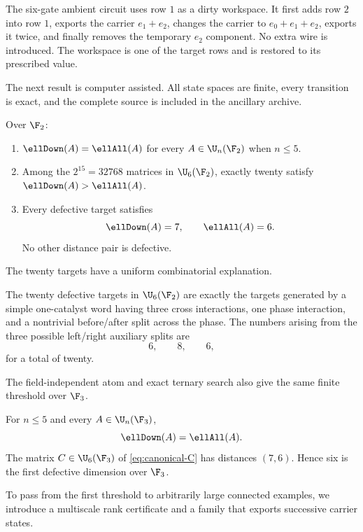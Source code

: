The six-gate ambient circuit uses row $1$ as a dirty workspace.  It first adds row $2$ into row $1$, exports the carrier $e_1+e_2$, changes the carrier to $e_0+e_1+e_2$, exports it twice, and finally removes the temporary $e_2$ component.  No extra wire is introduced.  The workspace is one of the target rows and is restored to its prescribed value.

The next result is computer assisted.  All state spaces are finite, every transition is exact, and the complete source is included in the ancillary archive.

\begin{theorem}\label{thm:binary-census}
Over $\F_2$:
\begin{enumerate}[label=\textup{(\roman*)}]
\item $\ellDown(A)=\ellAll(A)$ for every $A\in\U_n(\F_2)$ when $n\le5$.
\item Among the $2^{15}=32768$ matrices in $\U_6(\F_2)$, exactly twenty satisfy $\ellDown(A)>\ellAll(A)$.
\item Every defective target satisfies
\[
\ellDown(A)=7,
\qquad
\ellAll(A)=6.
\]
No other distance pair is defective.
\end{enumerate}
\end{theorem}

The twenty targets have a uniform combinatorial explanation.

\begin{theorem}\label{thm:motif-classification}
The twenty defective targets in $\U_6(\F_2)$ are exactly the targets generated by a simple one-catalyst word having three cross interactions, one phase interaction, and a nontrivial before/after split across the phase.  The numbers arising from the three possible left/right auxiliary splits are
\[
6,
\qquad
8,
\qquad
6,
\]
for a total of twenty.
\end{theorem}

The field-independent atom and exact ternary search also give the same finite threshold over $\F_3$.

\begin{theorem}\label{thm:ternary-threshold}
For $n\le5$ and every $A\in\U_n(\F_3)$,
\[
\ellDown(A)=\ellAll(A).
\]
The matrix $C\in\U_6(\F_3)$ of \cref{eq:canonical-C} has distances $(7,6)$.  Hence six is the first defective dimension over $\F_3$.
\end{theorem}

To pass from the first threshold to arbitrarily large connected examples, we introduce a multiscale rank certificate and a family that exports successive carrier states.

